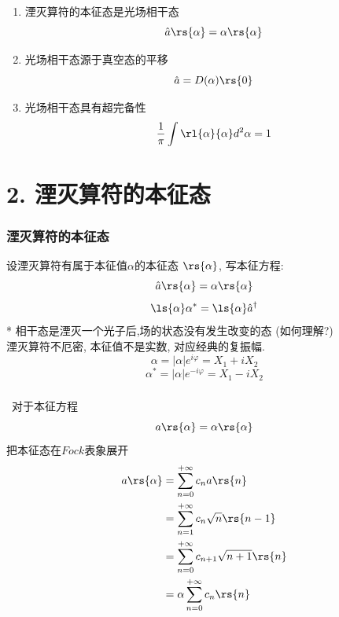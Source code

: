 \begin{frame} 
    \begin{tcolorbox4}[相干态基本命题:]
        \begin{enumerate}
            \item 湮灭算符的本征态是光场相干态
            \[ \hat{a}\rs{\alpha}= \alpha\rs{\alpha}\]
            \item 光场相干态源于真空态的平移
            \[ \hat{a} =  D(\alpha)  \rs{0}  \]
            \item 光场相干态具有超完备性
            \[ \frac{1}{\pi} \int \rl{\alpha}{\alpha}d ^2 \alpha =1\]
        \end{enumerate}  
    \end{tcolorbox4}
\end{frame}


\section{2. 湮灭算符的本征态}

\begin{frame}
    \frametitle{湮灭算符的本征态}
    设湮灭算符有属于本征值$\alpha$的本征态 $\rs{\alpha}$, 写本征方程: 
    \[ \hat{a}\rs{\alpha}= \alpha\rs{\alpha}\]
    \[ \ls{\alpha}\alpha^* =\ls{\alpha}\hat{a}^\dagger\]
    * 相干态是湮灭一个光子后,场的状态没有发生改变的态 (如何理解?)\\  {\vspace*{0.6em}}
    湮灭算符不厄密, 本征值不是实数, 对应经典的复振幅. 
    \[ \alpha =\left|\alpha\right| e^{i\varphi} = X_1 + i X_2\]
    \[ \alpha^* =\left|\alpha\right| e^{-i\varphi} = X_1 - i X_2\]
\end{frame}

\begin{frame}
    \frametitle{}     
    \解 ~对于本征方程
    \[ a \rs{\alpha} = \alpha \rs{\alpha} \]
    把本征态在$Fock$表象展开 
  \[\begin{aligned}
      a \rs{\alpha} &=\sum_{n=0} ^{+\infty} c_n a \rs{n} \\
      &=  \sum_{n=1} ^{+\infty} c_n \sqrt{n} \rs{n-1} \\
      &=  \sum_{n=0} ^{+\infty} c_{n+1} \sqrt{n+1} \rs{n} \\
      &=   \alpha \sum_{n=0} ^{+\infty} c_n  \rs{n}  
  \end{aligned} \]
\end{frame}

